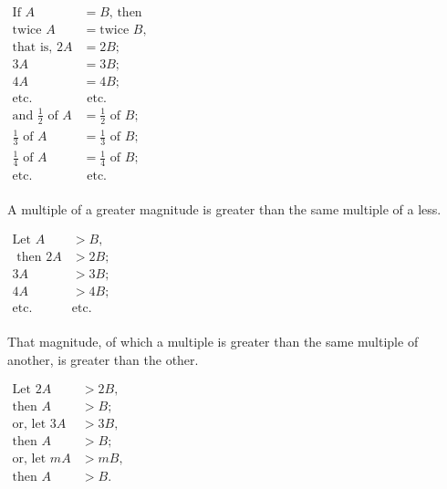 \documentclass[booklanguage=english]{byrnebook}
\begin{document}
\begin{center}
$
\begin{aligned}
	\mbox{If } A &= B \mbox{, then}\\
	\mbox{twice } A &= \mbox{twice } B \mbox{,}\\
	\mbox{that is, }2A &= 2B \mbox{;}\\
	3A &= 3B \mbox{;}\\
	4A &= 4B \mbox{;}\\
	\mbox{etc.} & \mbox{ etc.}\\
	\mbox{and } \frac{1}{2} \mbox{ of } A &= \frac{1}{2} \mbox{ of } B \mbox{;}\\
	\frac{1}{3} \mbox{ of } A &= \frac{1}{3} \mbox{ of } B \mbox{;}\\
	\frac{1}{4} \mbox{ of } A &= \frac{1}{4} \mbox{ of } B \mbox{;}\\
	\mbox{etc. } & \mbox{ etc.}\\
\end{aligned}
$
\end{center}

\startaxiom{}\label{ax:V.II}
A multiple of a greater magnitude is greater than the same multiple of a less.

\begin{center}
$\begin{aligned}
	\mbox{Let } A &> B \mbox{,} \\
	\mbox{ then } 2A &> 2B \mbox{;}\\
	3A&> 3B \mbox{;} \\
	4A &> 4B \mbox{;}\\
	\mbox{etc. } &\mbox{etc.} \\
\end{aligned}
$
\end{center}

\startaxiom{}\label{ax:V.III}
That magnitude, of which a multiple is greater than the same multiple of another, is greater than the other.

\begin{center}
$\begin{aligned}
\mbox{Let } 2A &> 2B \mbox{,}\\
\mbox{then } A &> B \mbox{;}\\
\mbox{or, let } 3A &> 3B \mbox{,}\\
\mbox{then } A &> B \mbox{;}\\
\mbox{or, let } mA &> mB  \mbox{,}\\
\mbox{then } A &> B \mbox{.}\\
\end{aligned}$
\end{center}
\end{document}
